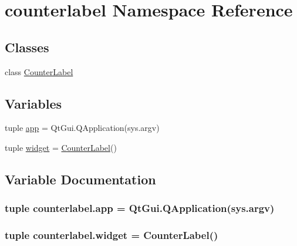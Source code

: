 \hypertarget{namespacecounterlabel}{}\section{counterlabel Namespace Reference}
\label{namespacecounterlabel}
\subsection*{Classes}
\begin{DoxyCompactItemize}
\item 
class \hyperlink{classcounterlabel_1_1CounterLabel}{Counter\+Label}
\end{DoxyCompactItemize}
\subsection*{Variables}
\begin{DoxyCompactItemize}
\item 
tuple \hyperlink{namespacecounterlabel_a19c7a6c414808172c5f1af899217c35a}{app} = Qt\+Gui.\+Q\+Application(sys.\+argv)
\item 
tuple \hyperlink{namespacecounterlabel_a7f747abb6d0b889f75c5bcb58f03ed21}{widget} = \hyperlink{classcounterlabel_1_1CounterLabel}{Counter\+Label}()
\end{DoxyCompactItemize}


\subsection{Variable Documentation}
\hypertarget{namespacecounterlabel_a19c7a6c414808172c5f1af899217c35a}{}
\subsubsection[{app}]{\setlength{\rightskip}{0pt plus 5cm}tuple counterlabel.\+app = Qt\+Gui.\+Q\+Application(sys.\+argv)}\label{namespacecounterlabel_a19c7a6c414808172c5f1af899217c35a}
\hypertarget{namespacecounterlabel_a7f747abb6d0b889f75c5bcb58f03ed21}{}
\subsubsection[{widget}]{\setlength{\rightskip}{0pt plus 5cm}tuple counterlabel.\+widget = {\bf Counter\+Label}()}\label{namespacecounterlabel_a7f747abb6d0b889f75c5bcb58f03ed21}
